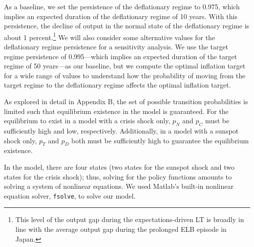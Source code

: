 \documentclass[11pt]{article}
\begin{document}
	As a baseline, we set the persistence of the deflationary regime to 0.975, which implies an expected duration of the deflationary regime of 10 years. With this persistence, the decline of output in the normal state of the deflationary regime is about 1 percent.\footnote{This level of the output gap during the expectations-driven LT is broadly in line with the average output gap during the prolonged ELB episode in Japan.} We will also consider some alternative values for the deflationary regime persistence for a sensitivity analysis. We use the target regime persistence of 0.995---which implies an expected duration of the target regime of 50 years---as our baseline, but we compute the optimal inflation target for a wide range of values to understand how the probability of moving from the target regime to the deflationary regime affects the optimal inflation target.

	As explored in detail in Appendix B, the set of possible transition probabilities is limited such that equilibrium existence in the model is guaranteed. For the equilibrium to exist in a model with a crisis shock only, $p_N$ and $p_C$ must be sufficiently high and low, respectively. Additionally, in a model with a sunspot shock only, $p_T$ and $p_D$ both must be sufficiently high to guarantee the equilibrium existence.

	In the model, there are four states (two states for the sunspot shock and two states for the crisis shock); thus, solving for the policy functions amounts to solving a system of nonlinear equations. We used Matlab's built-in nonlinear equation solver, \texttt{fsolve}, to solve our model.


\end{document}
